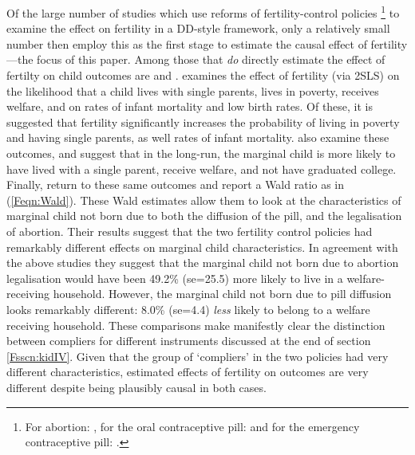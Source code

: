 \documentclass{article}
\begin{document}
\begin{spacing}{1.4}
Of the large number of studies which use reforms of fertility-control policies%
\footnote{For abortion: \citet{Ananatetal2007,Ananatetal2009,AngristEvans1996,
CharlesStephens2006,Cookeetal1999,Currieetal1996,Gruberetal1999,Guldi2008,
KaneStaiger1996,Levineetal1996,Levineetal1996b,Levineetal1999,PopEleches2005,
PopEleches2006}, for the oral contraceptive pill: \citet{OltmansHungerman2012,
Bailey2006,Bailey2011,Bailey2012,Bailey2013,Christensen2012,Goldin2006,
GoldinKatz2002a,GoldinKatz2002b,KearnerLevine2009} and for the emergency 
  contraceptive pill: \citet{Durrance2013,Grossetal2014,BentancorClarke2014}.}
to examine the effect on fertility in a 
DD-style framework, only a relatively small number then employ this 
as the first stage to estimate the causal effect of fertility---the focus of
this paper.  Among those that \emph{do} directly estimate the effect
of fertilty on child outcomes are \citet{Gruberetal1999,Ananatetal2009} and
\citet{OltmansHungerman2012}. \citet{Gruberetal1999} examines the effect of 
fertility (via 2SLS) on the likelihood that a child lives with single parents, 
lives in poverty, receives welfare, and on rates of infant mortality and low 
birth rates.  Of these, it is suggested that fertility significantly increases 
the probability of living in poverty and having single parents, as well rates 
of infant mortality. \citet{Ananatetal2009} also examine these outcomes, and 
suggest that in the long-run, the marginal child is more likely to have lived 
with a single parent, receive welfare, and not have graduated college.
Finally, \citet{OltmansHungerman2012} return to these same outcomes and report
a Wald ratio as in (\ref{Feqn:Wald}).  These Wald estimates allow them to look
at the characteristics of marginal child not born due to both the diffusion of 
the pill, and the legalisation of abortion.  Their results suggest that the two 
fertility control policies had remarkably different effects on marginal child 
characteristics.  In agreement with the above studies they suggest that the
marginal child not born due to abortion legalisation would have been 49.2\%
(se=25.5) more likely to live in a welfare-receiving household.  However, the 
marginal child not born due to pill diffusion looks remarkably different: 8.0\% 
(se=4.4) \emph{less} likely to belong to a welfare receiving household.  These 
comparisons make manifestly clear the distinction between compliers for 
different instruments discussed at the end of section \ref{Fsscn:kidIV}.
Given that the group of `compliers' in the two policies had very different
characteristics, estimated effects of fertility on outcomes are very different
despite being plausibly causal in both cases.


\end{spacing}
\end{document}
